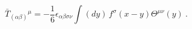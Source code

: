 \begin{equation}
{\bar{T}}_{(\alpha \beta )}{}^{\mu }=-\frac{1}{6}\epsilon _{\alpha \beta
\sigma \nu }\int (dy)\,f^{\sigma }(x-y)\Theta ^{\mu \nu }(y)\ .
\end{equation}%
